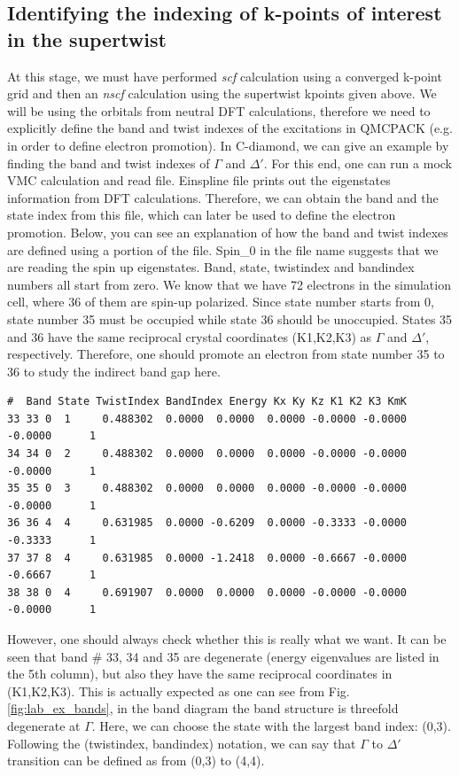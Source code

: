\subsection{Identifying the indexing of k-points of interest in the supertwist}
At this stage, we must have performed \textit{scf} calculation using a converged k-point grid and then an \textit{nscf} calculation using the supertwist kpoints given above. 
We will be using the orbitals from neutral DFT calculations, therefore we need to explicitly define the band and twist indexes of the excitations in QMCPACK (e.g. in order to define electron promotion).
In C-diamond, we can give an example by finding the band and twist indexes of $\Gamma$ and $\Delta'$. 
For this end, one can run a mock VMC calculation and read   file. Einspline file prints out the eigenstates information from DFT calculations. 
Therefore, we can obtain the band and the state index from this file, which can later be used to define the electron promotion. 
Below, you can see an explanation of how the band and twist indexes are defined using a portion of the  file. 
Spin\_0 in the file name suggests that we are reading the spin up eigenstates. Band, state, twistindex and bandindex numbers all start from zero. We know that we have 72 electrons in the simulation cell, where 36 of them are spin-up polarized. 
Since state number starts from 0, state number 35 must be occupied while state 36 should be unoccupied. 
States 35 and 36 have the same reciprocal crystal coordinates (K1,K2,K3) as $\Gamma$ and $\Delta'$, respectively. 
Therefore, one should promote an electron from state number 35 to 36 to study the indirect band gap here.
\begin{lstlisting}[style=SHELL]
#  Band State TwistIndex BandIndex Energy Kx Ky Kz K1 K2 K3 KmK
33 33 0  1     0.488302  0.0000  0.0000  0.0000 -0.0000 -0.0000 -0.0000      1
34 34 0  2     0.488302  0.0000  0.0000  0.0000 -0.0000 -0.0000 -0.0000      1
35 35 0  3     0.488302  0.0000  0.0000  0.0000 -0.0000 -0.0000 -0.0000      1
36 36 4  4     0.631985  0.0000 -0.6209  0.0000 -0.3333 -0.0000 -0.3333      1
37 37 8  4     0.631985  0.0000 -1.2418  0.0000 -0.6667 -0.0000 -0.6667      1
38 38 0  4     0.691907  0.0000  0.0000  0.0000 -0.0000 -0.0000 -0.0000      1
\end{lstlisting}
However, one should always check whether this is really what we want. 
It can be seen  that band \# 33, 34 and 35 are degenerate (energy eigenvalues are listed in the 5th column), but also they have the same reciprocal coordinates in (K1,K2,K3). 
This is actually expected as one can see from Fig. \ref{fig:lab_ex_bands}, in the band diagram the band structure is threefold degenerate at $\Gamma$.  
Here, we can choose the state with the largest band index: (0,3). 
Following the (twistindex, bandindex) notation, we can say that $\Gamma$ to $\Delta'$ transition can be defined as from (0,3) to (4,4). 

